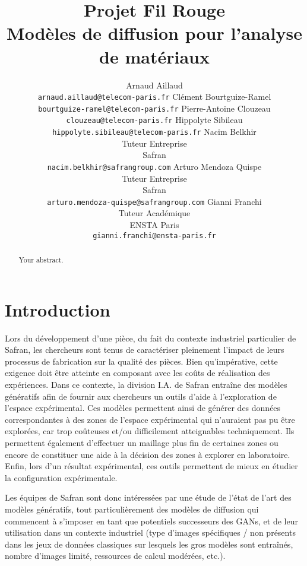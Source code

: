 \documentclass{article}
\title{Projet Fil Rouge \\  Modèles de diffusion pour l'analyse de matériaux}
\author{Arnaud Aillaud\\ \texttt{arnaud.aillaud@telecom-paris.fr}
\And Clément Bourtguize-Ramel\\ \texttt{bourtguize-ramel@telecom-paris.fr}
\AND Pierre-Antoine Clouzeau\\ \texttt{clouzeau@telecom-paris.fr}
\And Hippolyte Sibileau\\ \texttt{hippolyte.sibileau@telecom-paris.fr}
\AND Nacim Belkhir\\  Tuteur Entreprise\\ Safran\\ \texttt{nacim.belkhir@safrangroup.com} 
\And Arturo Mendoza Quispe\\  Tuteur Entreprise\\ Safran\\ \texttt{arturo.mendoza-quispe@safrangroup.com}
\And Gianni Franchi\\ Tuteur Académique\\ ENSTA Paris\\ \texttt{gianni.franchi@ensta-paris.fr} }
\begin{document}
\maketitle

\begin{abstract}
Your abstract.
\end{abstract}

\tableofcontents
\pagebreak

\section{Introduction}

Lors du développement d'une pièce, du fait du contexte industriel particulier de Safran, les chercheurs sont tenus de caractériser pleinement l'impact de leurs processus de fabrication sur la qualité des pièces. Bien qu'impérative, cette exigence doit être atteinte en composant avec les coûts de réalisation des expériences. Dans ce contexte, la division I.A. de Safran entraîne des modèles génératifs afin de fournir aux chercheurs un outils d'aide à l'exploration de l'espace expérimental. Ces modèles permettent ainsi de générer des données correspondantes à des zones de l'espace expérimental qui n'auraient pas pu être explorées, car trop coûteuses et/ou difficilement atteignables techniquement. Ils permettent également d'effectuer un maillage plus fin de certaines zones ou encore de constituer une aide à la décision des zones à explorer en laboratoire. Enfin, lors d'un résultat expérimental, ces outils permettent de mieux en étudier la configuration expérimentale.

Les équipes de Safran sont donc intéressées par une étude de l'état de l'art des modèles génératifs, tout particulièrement des modèles de diffusion qui commencent à s'imposer en tant que potentiels successeurs des GANs, et de leur utilisation dans un contexte industriel (type d'images spécifiques / non présents dans les jeux de données classiques sur lesquels les gros modèles sont entraînés, nombre d'images limité, ressources de calcul modérées, etc.).
\end{document}

